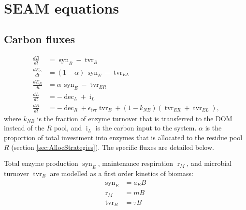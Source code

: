 \section{\hspace*{-7mm}  SEAM equations \label{app:SEAM}
}    

\subsection{Carbon fluxes}
\begin{subequations}
\label{eq:SEAM}
\begin{align}
\frac{dB}{dt} &= \operatorname{syn}_B - \operatorname{tvr}_B \\
\frac{dE_L}{dt} &= (1 - \alpha)  \, \operatorname{syn}_E -\operatorname{tvr}_{EL}\\
\frac{dE_R}{dt} &= \alpha \, \operatorname{syn}_E - \operatorname{tvr}_{ER} \\
\frac{dL}{dt} &=  - \operatorname{dec}_L + \operatorname{i}_L
\\
\frac{dR}{dt} &=  - \operatorname{dec}_R +
\epsilon_{\operatorname{tvr}}  \operatorname{tvr}_B + (1 -k_{NB})
(\operatorname{tvr}_{ER} + \operatorname{tvr}_{EL})
\text{,} 
\end{align}
\end{subequations}
where $k_{NB}$ is the fraction of enzyme turnover that is transferred to the
DOM instead of the $R$ pool, and $\operatorname{i}_L$ is the carbon input
to the system. $\alpha$ is the proportion of total investment into enzymes
that is allocated to the residue pool $R$ (section \ref{sec:AllocStrategies}).
The specific fluxes are detailed below.

Total enzyme production $\operatorname{syn}_E$, maintenance respiration
$\operatorname{r}_{M}$, and microbial turnover $\operatorname{tvr}_B$ are
modelled as a first order kinetics of biomass:
\begin{subequations}
\begin{align}
\label{eq:synE} \operatorname{syn}_E &= a_E B \\
\label{eq:rM} \operatorname{r}_{M} &= m B \\
\label{eq:tvrB} \operatorname{tvr}_B &= \tau B 
\end{align}
\end{subequations}


